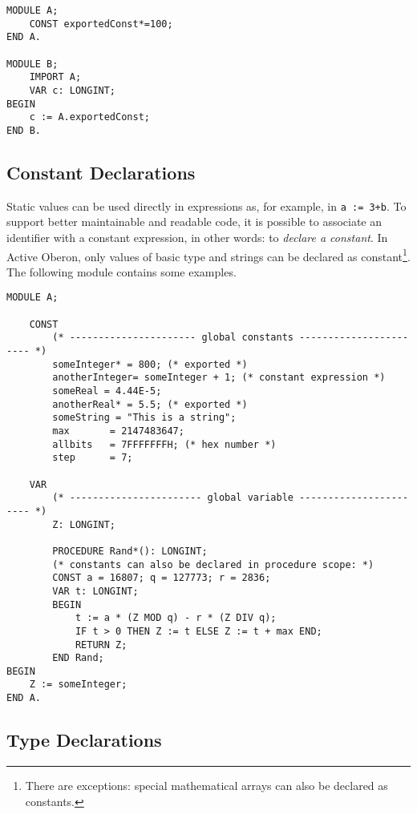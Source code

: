 \documentclass[a4paper,11pt]{article}
\begin{document}
\begin{lstlisting}[language=Oberon,frame=none,caption={B imports A}]
MODULE A;
    CONST exportedConst*=100;
END A.

MODULE B;
    IMPORT A;
    VAR c: LONGINT;
BEGIN
    c := A.exportedConst;
END B.
\end{lstlisting}

\subsection{Constant Declarations}
Static values can be used directly in expressions as, for example, in \verb~a := 3+b~. To support better maintainable and readable code, it is possible to associate an identifier with a constant expression, in other words: to {\em declare a constant}. In Active Oberon, only values of basic type and strings can be declared as constant\footnote{There are exceptions: special mathematical arrays can also be declared as constants.}. The following module contains some examples.

\begin{lstlisting}[language=Oberon,frame=none,caption={Declaration and Usage of Constants}]
MODULE A;

    CONST 
        (* ---------------------- global constants ----------------------- *) 
        someInteger* = 800; (* exported *) 
        anotherInteger= someInteger + 1; (* constant expression *) 
        someReal = 4.44E-5;
        anotherReal* = 5.5; (* exported *) 
        someString = "This is a string"; 
        max       = 2147483647;
        allbits   = 7FFFFFFFH; (* hex number *) 
        step      = 7;
        
    VAR 
        (* ----------------------- global variable ----------------------- *) 
        Z: LONGINT; 
        
        PROCEDURE Rand*(): LONGINT;
        (* constants can also be declared in procedure scope: *) 
        CONST a = 16807; q = 127773; r = 2836; 
        VAR t: LONGINT;
        BEGIN
            t := a * (Z MOD q) - r * (Z DIV q);
            IF t > 0 THEN Z := t ELSE Z := t + max END;
            RETURN Z;
        END Rand;
BEGIN 
    Z := someInteger; 
END A.
\end{lstlisting}

\subsection{Type Declarations}
\end{document}
